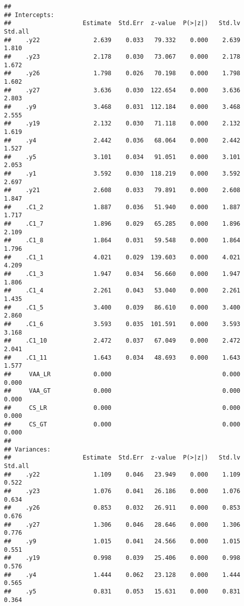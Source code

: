 \documentclass[
]{article}
\begin{document}
\begin{verbatim}
## 
## Intercepts:
##                    Estimate  Std.Err  z-value  P(>|z|)   Std.lv  Std.all
##    .y22               2.639    0.033   79.332    0.000    2.639    1.810
##    .y23               2.178    0.030   73.067    0.000    2.178    1.672
##    .y26               1.798    0.026   70.198    0.000    1.798    1.602
##    .y27               3.636    0.030  122.654    0.000    3.636    2.803
##    .y9                3.468    0.031  112.184    0.000    3.468    2.555
##    .y19               2.132    0.030   71.118    0.000    2.132    1.619
##    .y4                2.442    0.036   68.064    0.000    2.442    1.527
##    .y5                3.101    0.034   91.051    0.000    3.101    2.053
##    .y1                3.592    0.030  118.219    0.000    3.592    2.697
##    .y21               2.608    0.033   79.891    0.000    2.608    1.847
##    .C1_2              1.887    0.036   51.940    0.000    1.887    1.717
##    .C1_7              1.896    0.029   65.285    0.000    1.896    2.109
##    .C1_8              1.864    0.031   59.548    0.000    1.864    1.796
##    .C1_1              4.021    0.029  139.603    0.000    4.021    4.209
##    .C1_3              1.947    0.034   56.660    0.000    1.947    1.806
##    .C1_4              2.261    0.043   53.040    0.000    2.261    1.435
##    .C1_5              3.400    0.039   86.610    0.000    3.400    2.860
##    .C1_6              3.593    0.035  101.591    0.000    3.593    3.168
##    .C1_10             2.472    0.037   67.049    0.000    2.472    2.041
##    .C1_11             1.643    0.034   48.693    0.000    1.643    1.577
##     VAA_LR            0.000                               0.000    0.000
##     VAA_GT            0.000                               0.000    0.000
##     CS_LR             0.000                               0.000    0.000
##     CS_GT             0.000                               0.000    0.000
## 
## Variances:
##                    Estimate  Std.Err  z-value  P(>|z|)   Std.lv  Std.all
##    .y22               1.109    0.046   23.949    0.000    1.109    0.522
##    .y23               1.076    0.041   26.186    0.000    1.076    0.634
##    .y26               0.853    0.032   26.911    0.000    0.853    0.676
##    .y27               1.306    0.046   28.646    0.000    1.306    0.776
##    .y9                1.015    0.041   24.566    0.000    1.015    0.551
##    .y19               0.998    0.039   25.406    0.000    0.998    0.576
##    .y4                1.444    0.062   23.128    0.000    1.444    0.565
##    .y5                0.831    0.053   15.631    0.000    0.831    0.364

\end{verbatim}
\end{document}
